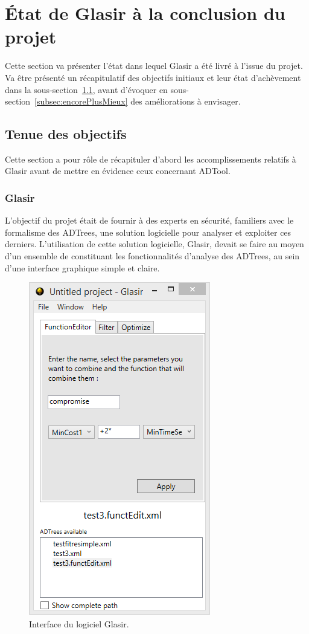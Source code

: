 \section{État de Glasir à la conclusion du projet}
\label{sec:etatFinal}

Cette section va présenter l'état dans lequel Glasir a été livré à l'issue du projet. Va être présenté un récapitulatif des objectifs initiaux et leur état d'achèvement dans la {\sc sous-section}~\ref{subsec:objOK}, avant d'évoquer en {\sc sous-section}~\ref{subsec:encorePlusMieux} des améliorations à envisager.

\subsection{Tenue des objectifs}
\label{subsec:objOK}

Cette section a pour rôle de récapituler d'abord les accomplissements relatifs à Glasir avant de mettre en évidence ceux concernant ADTool.

\subsubsection{Glasir}
\label{sssec:obj_glasir}

L'objectif du projet était de fournir à des experts en sécurité, familiers avec le formalisme des ADTrees, une solution logicielle pour analyser et exploiter ces derniers. L'utilisation de cette solution logicielle, Glasir, devait se faire au moyen d'un ensemble de \fg constituant les fonctionnalités d'analyse des ADTrees, au sein d'une interface graphique simple et claire.

    \begin{figure}[!h]
        \centering
        \includegraphics[height=0.7\textwidth]{figure/interface.png}
        \caption{Interface du logiciel Glasir.}
        \label{fig:InterfaceGlasir}
    \end{figure}


